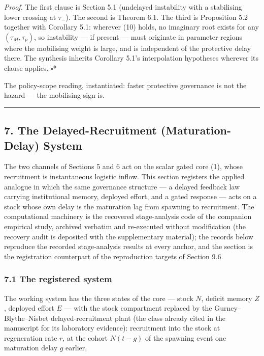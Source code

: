 \documentclass[11pt]{article}
\begin{document}
\emph{Proof.} The first clause is Section 5.1 (undelayed instability
with a stabilising lower crossing at \(\tau_-\)). The second is Theorem
6.1. The third is Proposition 5.2 together with Corollary 5.1: wherever
(10) holds, no imaginary root exists for any \((\tau_M, \tau_p)\), so
instability --- if present --- must originate in parameter regions where
the mobilising weight is large, and is independent of the protective
delay there. The synthesis inherits Corollary 5.1's interpolation
hypotheses wherever its clause applies. \ensuremath{\square}*

The policy-scope reading, instantiated: faster protective governance is
not the hazard --- the mobilising sign is.

\begin{center}\rule{0.5\linewidth}{0.5pt}\end{center}

\subsection{7. The Delayed-Recruitment (Maturation-Delay)
System}\label{the-delayed-recruitment-maturation-delay-system}

The two channels of Sections 5 and 6 act on the scalar gated core (1),
whose recruitment is instantaneous logistic inflow. This section
registers the applied analogue in which the same governance structure
--- a delayed feedback law carrying institutional memory, deployed
effort, and a gated response --- acts on a stock whose own delay is the
maturation lag from spawning to recruitment. The computational machinery
is the recovered stage-analysis code of the companion empirical study,
archived verbatim and re-executed without modification (the recovery
audit is deposited with the supplementary material); the records below
reproduce the recorded stage-analysis results at every anchor, and the
section is the registration counterpart of the reproduction targets of
Section 9.6.

\subsubsection{7.1 The registered system}\label{the-registered-system}

The working system has the three states of the core --- stock \(N\),
deficit memory \(Z\), deployed effort \(E\) --- with the stock
compartment replaced by the Gurney--Blythe--Nisbet delayed-recruitment
plant (the class already cited in the manuscript for its laboratory
evidence): recruitment into the stock at regeneration rate \(r\), at the
cohort \(N(t-g)\) of the spawning event one maturation delay \(g\)
earlier,
\end{document}
